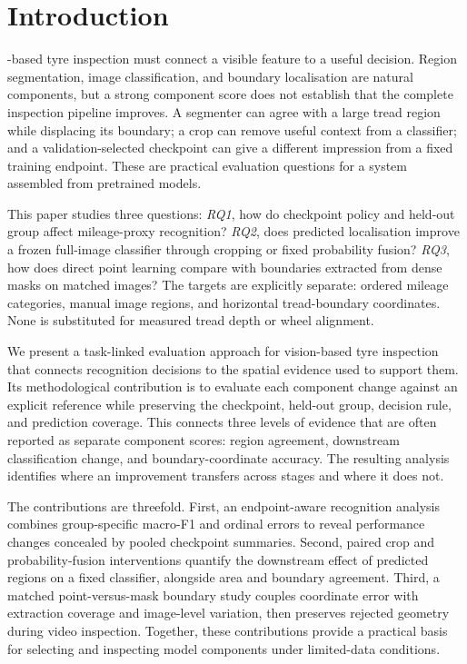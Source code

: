 \section{Introduction}
\label{sec:intro}
-based tyre inspection must connect a visible feature to a useful decision. Region segmentation, image classification, and boundary localisation are natural components, but a strong component score does not establish that the complete inspection pipeline improves. A segmenter can agree with a large tread region while displacing its boundary; a crop can remove useful context from a classifier; and a validation-selected checkpoint can give a different impression from a fixed training endpoint. These are practical evaluation questions for a system assembled from pretrained models.

This paper studies three questions: \textit{RQ1}, how do checkpoint policy and held-out group affect mileage-proxy recognition? \textit{RQ2}, does predicted localisation improve a frozen full-image classifier through cropping or fixed probability fusion? \textit{RQ3}, how does direct point learning compare with boundaries extracted from dense masks on matched images? The targets are explicitly separate: ordered mileage categories, manual image regions, and horizontal tread-boundary coordinates. None is substituted for measured tread depth or wheel alignment.

We present a task-linked evaluation approach for vision-based tyre inspection that connects recognition decisions to the spatial evidence used to support them. Its methodological contribution is to evaluate each component change against an explicit reference while preserving the checkpoint, held-out group, decision rule, and prediction coverage. This connects three levels of evidence that are often reported as separate component scores: region agreement, downstream classification change, and boundary-coordinate accuracy. The resulting analysis identifies where an improvement transfers across stages and where it does not.

The contributions are threefold. First, an endpoint-aware recognition analysis combines group-specific macro-F1 and ordinal errors to reveal performance changes concealed by pooled checkpoint summaries. Second, paired crop and probability-fusion interventions quantify the downstream effect of predicted regions on a fixed classifier, alongside area and boundary agreement. Third, a matched point-versus-mask boundary study couples coordinate error with extraction coverage and image-level variation, then preserves rejected geometry during video inspection. Together, these contributions provide a practical basis for selecting and inspecting model components under limited-data conditions.

